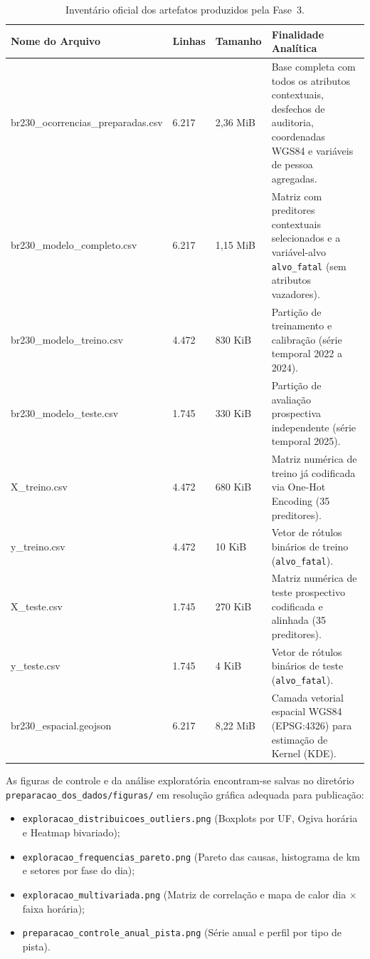 \documentclass[11pt,a4paper]{article}
\begin{document}
\begin{table}[H]
  \centering
  \small
  \renewcommand{\arraystretch}{1.2}
  \caption{Inventário oficial dos artefatos produzidos pela Fase~3.}
  \label{tab:inventario_artefatos}
  \begin{tabularx}{\textwidth}{|>{\raggedright\arraybackslash\ttfamily\footnotesize}p{5.4cm}|Y|Y|L|}
    \hline
    \textbf{Nome do Arquivo} & \textbf{Linhas} & \textbf{Tamanho} & \textbf{Finalidade Analítica} \\
    \hline
    br230\_ocorrencias\_preparadas.csv & 6.217 & 2,36 MiB & Base completa com todos os atributos contextuais, desfechos de auditoria, coordenadas WGS84 e variáveis de pessoa agregadas. \\
    \hline
    br230\_modelo\_completo.csv & 6.217 & 1,15 MiB & Matriz com preditores contextuais selecionados e a variável-alvo \texttt{alvo\_fatal} (sem atributos vazadores). \\
    \hline
    br230\_modelo\_treino.csv & 4.472 & 830 KiB & Partição de treinamento e calibração (série temporal 2022 a 2024). \\
    \hline
    br230\_modelo\_teste.csv & 1.745 & 330 KiB & Partição de avaliação prospectiva independente (série temporal 2025). \\
    \hline
    X\_treino.csv & 4.472 & 680 KiB & Matriz numérica de treino já codificada via One-Hot Encoding (35 preditores). \\
    \hline
    y\_treino.csv & 4.472 & 10 KiB & Vetor de rótulos binários de treino (\texttt{alvo\_fatal}). \\
    \hline
    X\_teste.csv & 1.745 & 270 KiB & Matriz numérica de teste prospectivo codificada e alinhada (35 preditores). \\
    \hline
    y\_teste.csv & 1.745 & 4 KiB & Vetor de rótulos binários de teste (\texttt{alvo\_fatal}). \\
    \hline
    br230\_espacial.geojson & 6.217 & 8,22 MiB & Camada vetorial espacial WGS84 (EPSG:4326) para estimação de Kernel (KDE). \\
    \hline
  \end{tabularx}
\end{table}

As figuras de controle e da análise exploratória encontram-se salvas no diretório \texttt{preparacao\_dos\_dados/}\allowbreak\texttt{figuras/} em resolução gráfica adequada para publicação:
\begin{itemize}
  \item \texttt{exploracao\_distribuicoes\_outliers.png} (Boxplots por UF, Ogiva horária e Heatmap bivariado);
  \item \texttt{exploracao\_frequencias\_pareto.png} (Pareto das causas, histograma de km e setores por fase do dia);
  \item \texttt{exploracao\_multivariada.png} (Matriz de correlação e mapa de calor dia $\times$ faixa horária);
  \item \texttt{preparacao\_controle\_anual\_pista.png} (Série anual e perfil por tipo de pista).
\end{itemize}
\end{document}
